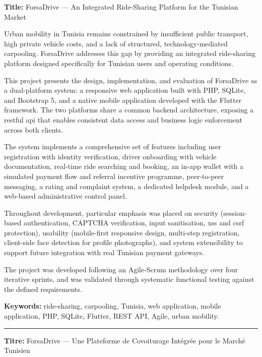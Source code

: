 \documentclass[12pt,a4paper,openright]{report}
\begin{document}
\noindent\textbf{Title:} ForsaDrive --- An Integrated Ride-Sharing Platform for the Tunisian Market

\vspace{0.4cm}

Urban mobility in Tunisia remains constrained by insufficient public transport, high private vehicle costs, and a lack of structured, technology-mediated carpooling. ForsaDrive addresses this gap by providing an integrated ride-sharing platform designed specifically for Tunisian users and operating conditions.

This project presents the design, implementation, and evaluation of ForsaDrive as a dual-platform system: a responsive web application built with PHP, SQLite, and Bootstrap 5, and a native mobile application developed with the Flutter framework. The two platforms share a common backend architecture, exposing a \gls{rest}ful \gls{api} that enables consistent data access and business logic enforcement across both clients.

The system implements a comprehensive set of features including user registration with identity verification, driver onboarding with vehicle documentation, real-time ride searching and booking, an in-app wallet with a simulated payment flow and referral incentive programme, peer-to-peer messaging, a rating and complaint system, a dedicated helpdesk module, and a web-based administrative control panel.

Throughout development, particular emphasis was placed on security (session-based authentication, CAPTCHA verification, input sanitisation, \gls{xss} and \gls{csrf} protection), usability (mobile-first responsive design, multi-step registration, client-side face detection for profile photographs), and system extensibility to support future integration with real Tunisian payment gateways.

The project was developed following an Agile-Scrum methodology over four iterative sprints, and was validated through systematic functional testing against the defined requirements.

\vspace{0.5cm}
\noindent\textbf{Keywords:} ride-sharing, carpooling, Tunisia, web application, mobile application, PHP, SQLite, Flutter, REST API, Agile, urban mobility.

\vspace{1cm}

\noindent\rule{\textwidth}{0.4pt}
\vspace{0.3cm}
\noindent\textbf{Titre:} ForsaDrive --- Une Plateforme de Covoiturage Intégrée pour le Marché Tunisien
\end{document}
